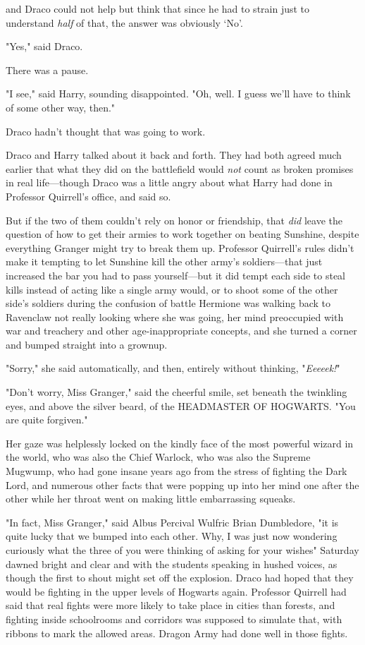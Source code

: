 {\el} and Draco could not help but think that since he had to strain just to
understand \emph{half} of that, the answer was obviously `No'.

"Yes," said Draco.

There was a pause.

"I see," said Harry, sounding disappointed. "Oh, well. I guess we'll have to
think of some other way, then."

Draco hadn't thought that was going to work.

Draco and Harry talked about it back and forth. They had both agreed much
earlier that what they did on the battlefield would \emph{not} count as broken
promises in real life---though Draco was a little angry about what Harry had
done in Professor Quirrell's office, and said so.

But if the two of them couldn't rely on honor or friendship, that \emph{did}
leave the question of how to get their armies to work together on beating
Sunshine, despite everything Granger might try to break them up. Professor
Quirrell's rules didn't make it tempting to let Sunshine kill the other army's
soldiers---that just increased the bar you had to pass yourself---but it did
tempt each side to steal kills instead of acting like a single army would, or
to shoot some of the other side's soldiers during the confusion of
battle{\el}
\sbreak
Hermione was walking back to Ravenclaw not really looking where she was going,
her mind preoccupied with war and treachery and other age-inappropriate
concepts, and she turned a corner and bumped straight into a grownup.

"Sorry," she said automatically, and then, entirely without thinking,
"\emph{Eeeeek!}"

"Don't worry, Miss Granger," said the cheerful smile, set beneath the twinkling
eyes, and above the silver beard, of the HEADMASTER OF HOGWARTS. "You are quite
forgiven."

Her gaze was helplessly locked on the kindly face of the most powerful wizard
in the world, who was also the Chief Warlock, who was also the Supreme Mugwump,
who had gone insane years ago from the stress of fighting the Dark Lord, and
numerous other facts that were popping up into her mind one after the other
while her throat went on making little embarrassing squeaks.

"In fact, Miss Granger," said Albus Percival Wulfric Brian Dumbledore, "it is
quite lucky that we bumped into each other. Why, I was just now wondering
curiously what the three of you were thinking of asking for your wishes{\el}"
\sbreak
Saturday dawned bright and clear and with the students speaking in hushed
voices, as though the first to shout might set off the explosion.
\sbreak
Draco had hoped that they would be fighting in the upper levels of Hogwarts
again. Professor Quirrell had said that real fights were more likely to take
place in cities than forests, and fighting inside schoolrooms and corridors was
supposed to simulate that, with ribbons to mark the allowed areas. Dragon Army
had done well in those fights.


